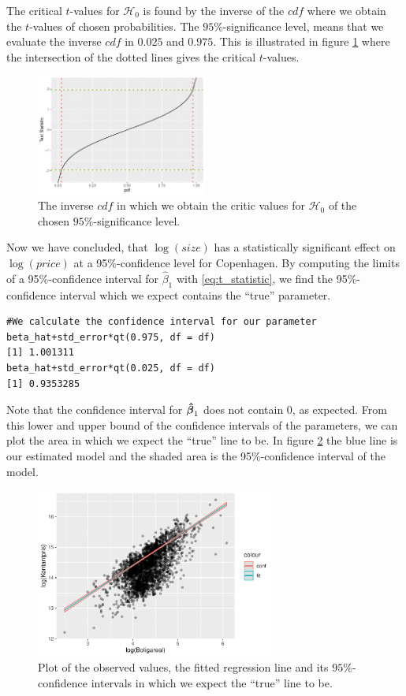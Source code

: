The critical $t$-values for $\mathcal{H}_0$ is found by the inverse of the $cdf$ where we obtain the $t$-values of chosen probabilities. 
The $95\%$-significance level, means that we evaluate the inverse $cdf$ in $0.025$ and $0.975$. 
This is illustrated in figure \ref{fig:CDF_inverse} where the intersection of the dotted lines gives the critical $t$-values.
\begin{figure}[H]
    \centering
    \includegraphics[width = 0.5\textwidth]{figures/Nanna/Inverse_CDF.pdf}
    \caption{The inverse $cdf$ in which we obtain the critic values for $\mathcal{H}_0$ of the chosen $95\%$-significance level.}
    \label{fig:CDF_inverse}
\end{figure}
Now we have concluded, that $\log(size)$ has a statistically significant effect on $\log(price)$ at a 95\%-confidence level for Copenhagen. 
By computing the limits of a 95\%-confidence interval for $\hat{\beta}_1$ with \eqref{eq:t_statistic}, we find the 95\%-confidence interval which we expect contains the ``true'' parameter.
\begin{lstlisting}
#We calculate the confidence interval for our parameter
beta_hat+std_error*qt(0.975, df = df)
[1] 1.001311
beta_hat+std_error*qt(0.025, df = df)
[1] 0.9353285
\end{lstlisting}
Note that the confidence interval for $\operatorname{\boldsymbol{\hat{\beta}}}_1$ does not contain 0, as expected.
From this lower and upper bound of the confidence intervals of the parameters, we can plot the area in which we expect the ``true'' line to be. 
In figure \ref{fig:t_distributionplot2} the blue line is our estimated model and the shaded area is the 95\%-confidence interval of the model. 
\begin{figure}[H]
    \centering
    \includegraphics[width = 0.7\textwidth]{figures/Nanna/Confidence_interval.pdf}
    \caption{Plot of the observed values, the fitted regression line and its $95\%$-confidence intervals in which we expect the ``true'' line to be.}
    \label{fig:t_distributionplot2}
\end{figure}

